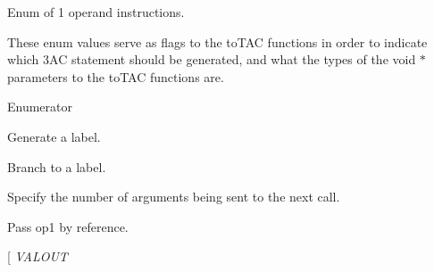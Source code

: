 Enum of 1 operand instructions. 

These enum values serve as flags to the to\-T\-A\-C functions in order to indicate which 3\-A\-C statement should be generated, and what the types of the void $\ast$ parameters to the to\-T\-A\-C functions are. \begin{Desc}
\item[Enumerator]\par
\begin{description}
\item[{\em 
\hypertarget{classTAC__Generator_ab58b7044cb5d16a454f4e01514175123a65bcd8393762141e07f6f31fe50fe5b9}{L\-A\-B\-E\-L}\label{classTAC__Generator_ab58b7044cb5d16a454f4e01514175123a65bcd8393762141e07f6f31fe50fe5b9}
}]Generate a label. \item[{\em 
\hypertarget{classTAC__Generator_ab58b7044cb5d16a454f4e01514175123ae86f99e1ff8f9ac1e3612a9c52175355}{B\-R}\label{classTAC__Generator_ab58b7044cb5d16a454f4e01514175123ae86f99e1ff8f9ac1e3612a9c52175355}
}]Branch to a label. \item[{\em 
\hypertarget{classTAC__Generator_ab58b7044cb5d16a454f4e01514175123a718d85ba9fd1c9b2b2c14b50407f4652}{A\-R\-G\-S}\label{classTAC__Generator_ab58b7044cb5d16a454f4e01514175123a718d85ba9fd1c9b2b2c14b50407f4652}
}]Specify the number of arguments being sent to the next call. \item[{\em 
\hypertarget{classTAC__Generator_ab58b7044cb5d16a454f4e01514175123a07ff54bea8f5c8324334f3dcb608a265}{R\-E\-F\-O\-U\-T}\label{classTAC__Generator_ab58b7044cb5d16a454f4e01514175123a07ff54bea8f5c8324334f3dcb608a265}
}]Pass op1 by reference. \item[{\em 
\hypertarget{classTAC__Generator_ab58b7044cb5d16a454f4e01514175123a78549b18a1baf838303fde2da14ddb0d}{V\-A\-L\-O\-U\-T}\label{classTAC__Generator_ab58b7044cb5d16a454f4e01514175123a78549b18a1baf838303fde2da14ddb0d}
}
\end{description}
\end{Desc}
